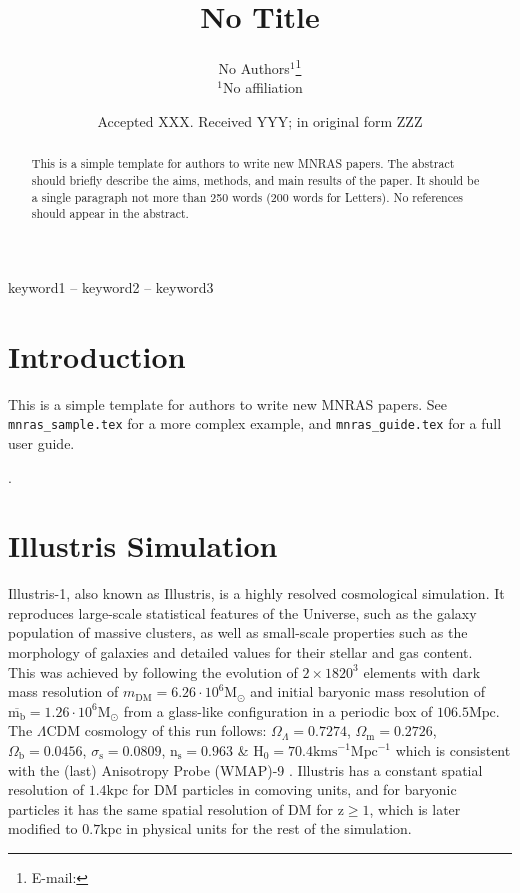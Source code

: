 \documentclass[a4paper,fleqn,usenatbib]{mnras}
\title[No Title]{No Title}
\author[No Author et al.]{
No Authors$^{1}$\thanks{E-mail: }\\
$^{1}$No affiliation\\
}
\date{Accepted XXX. Received YYY; in original form ZZZ}
\begin{document}
\label{firstpage}
\pagerange{\pageref{firstpage}--\pageref{lastpage}}
\maketitle

\begin{abstract}
This is a simple template for authors to write new MNRAS papers.
The abstract should briefly describe the aims, methods, and main results of the paper.
It should be a single paragraph not more than 250 words (200 words for Letters).
No references should appear in the abstract.
\end{abstract}

\begin{keywords}
keyword1 -- keyword2 -- keyword3
\end{keywords}



\section{Introduction}

This is a simple template for authors to write new MNRAS papers.
See \texttt{mnras\_sample.tex} for a more complex example, and \texttt{mnras\_guide.tex}
for a full user guide.

\cite{Forero2009}.

\section{Illustris Simulation}
Illustris-1, also known as Illustris, is a highly resolved
cosmological simulation. It reproduces large-scale statistical
features of the Universe, such as the galaxy population of massive
clusters, as well as small-scale properties such as the morphology of
galaxies and detailed values for their stellar and gas content.\\ 

This was achieved by following the evolution of $2 \times 1820^3$ elements with dark mass resolution of $m_{\text{DM}} = 6.26\cdot 10^6\text{M}_{\odot}$ and initial baryonic mass resolution of $\overline{\text{m}_\text{b}}=1.26\cdot 10^6\text{M}_{\odot}$ from a glass-like configuration in a periodic box of $106.5\text{Mpc}$. The $\Lambda \text{CDM}$ cosmology of this run follows: $\Omega_\Lambda=0.7274$, $\Omega_\text{m}=0.2726$, $\Omega_\text{b}=0.0456$, $\sigma_\text{s}=0.0809$, $\text{n}_\text{s}=0.963$ \& $\text{H}_0=70.4\text{kms}
^{-1}\text{Mpc}^{-1}$ which is consistent with the (last) Anisotropy
Probe (WMAP)-9 \cite{AnisotropyProbe}. Illustris has a constant
spatial resolution of $1.4\text{kpc}$ for DM particles in comoving
units, and for baryonic particles it has the same spatial resolution
of DM for $\text{z}\geq 1$, which is later modified to $0.7\text{kpc}$
in physical units for the rest of the simulation. \\ 
\end{document}
